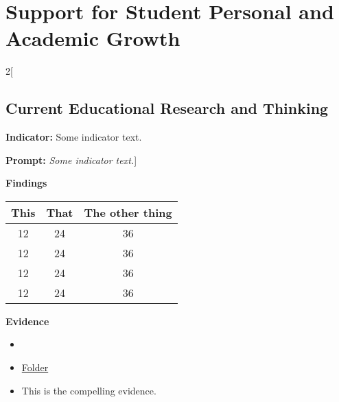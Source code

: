 \documentclass{report}
\begin{document}

\section{ Support for Student Personal and Academic Growth }
\blindtext

\blindtext
 
\begin{paracol}{2}[\subsection{Current Educational Research and Thinking}
\noindent\textbf{Indicator:} Some indicator text.

\noindent\textbf{Prompt:} \textit{Some indicator text.}]

\noindent\textbf{Findings}

\blindtext

\begin{table}[!h]
\begin{tabular}{c | c || c}
This & That & The other thing \\
\hline
12   &  24  &  36 \\
12   &  24  &  36 \\
12   &  24  &  36 \\
12   &  24  &  36 \\
\end{tabular}
\end{table}


\blindtext

\switchcolumn
\noindent\textbf{Evidence}
\vspace{-\topsep}

\begin{itemize}[leftmargin=*]
\setlength{\parskip}{0pt}
\setlength{\itemsep}{0pt plus 1pt}
\item \blindtext
\item \href{https://drive.google.com/a/cmis.ac.th/folderview?id=0ByVFfrm0zfolWE0yenprdktGVlk&usp=sharing}{Folder}
\item This is the compelling evidence.
\end{itemize}

\end{paracol}
\end{document}
